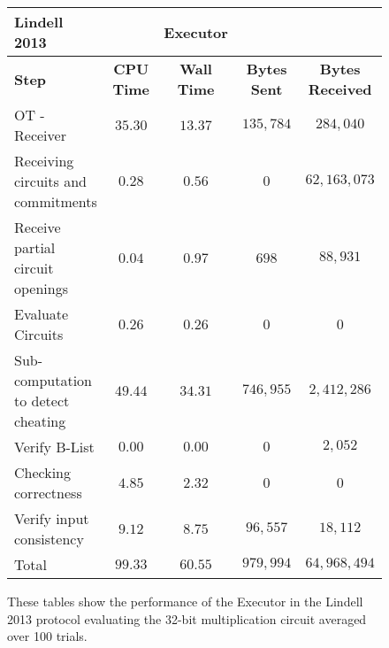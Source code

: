 \documentclass[ %
                    author={Nicholas Tutte},
                supervisor={Prof. Nigel Smart},
                    degree={MEng},
                     title={Secure Two Party Computation},
                  subtitle={A practical comparison of recent protocols},
                      type={Research - GG1K},
                      year={2015} ]{dissertation}
\begin{document}
				\begin{figure}
					\begin{tabular}{| p{3.5cm} | c c c c |}
						\hline
						\textbf{Lindell 2013} & & \textbf{Executor} & & \\
						\hline
						\textbf{Step} & \textbf{CPU Time} & \textbf{Wall Time} & \textbf{Bytes Sent} & \textbf{Bytes Received} \\
						\thickhline
						OT - Receiver & $35.30$ & $13.37$ & $135,784$ & $284,040$ \\
						\hline
						Receiving circuits and commitments & $0.28$ & $0.56$ & $0$ & $62,163,073$ \\
						\hline
						Receive partial circuit openings & $0.04$ & $0.97$ & $698$ & $88,931$ \\
						\hline
						Evaluate Circuits & $0.26$ & $0.26$ & $0$ & $0$ \\
						\hline
						Sub-computation to detect cheating & $49.44$ & $34.31$ & $746,955$ & $2,412,286$ \\
						\hline
						Verify B-List & $0.00$ & $0.00$ & $0$ & $2,052$ \\
						\hline
						Checking correctness & $4.85$ & $2.32$ & $0$ & $0$ \\
						\hline
						Verify input consistency& $9.12$ & $8.75$ & $96,557$ & $18,112$ \\
						\thickhline
						Total & $99.33$ & $60.55$ & $979,994$ & $64,968,494$ \\
						\hline
					\end{tabular}
					\caption{These tables show the performance of the Executor in the Lindell 2013 protocol evaluating the 32-bit multiplication circuit averaged over 100 trials.\label{table:L_2013_Mul_Executor} }
				\end{figure}
\end{document}
